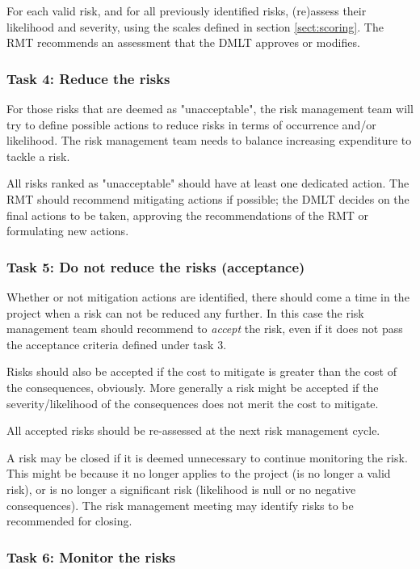 For each valid risk, and for all previously identified risks, (re)assess their likelihood and severity, using the scales defined in section \ref{sect:scoring}. The RMT recommends an assessment that the DMLT approves or modifies.

\subsubsection*{Task 4: Reduce the risks}

For those risks that are deemed as "unacceptable", the risk management team will try to define possible actions to reduce risks in terms of occurrence and/or likelihood.
The risk management team needs to balance increasing expenditure to tackle a risk.

All risks ranked as "unacceptable" should have at least one dedicated action.
The RMT should recommend mitigating actions if possible; the DMLT decides on the final actions to be taken, approving the recommendations of the RMT or formulating new actions. 

\subsubsection*{Task 5: Do not reduce the risks (acceptance)}

Whether or not mitigation actions are identified, there should come a time in the project when a risk can not be reduced any further. In this case the risk management team should recommend to {\em accept} the risk, even if it does not pass the acceptance criteria defined under task 3.

Risks should also be accepted if the cost to mitigate is greater than the cost of the consequences, obviously. More generally a risk might be accepted if the severity/likelihood of the consequences does not merit the cost to mitigate.

All accepted risks should be re-assessed at the next risk management cycle.

A risk may be closed if it is deemed unnecessary to continue monitoring the risk. This might be because it no longer applies to the project (is no longer a valid risk), or is no longer a significant risk (likelihood is null or no negative consequences). The risk management meeting may identify risks to be recommended for closing.

\subsubsection*{Task 6: Monitor the risks}

